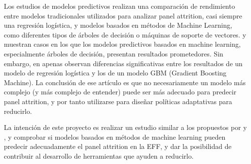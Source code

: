 Los estudios de modelos predictivos realizan una comparación de rendimiento entre modelos tradicionales utilizados para analizar panel attrition, casi siempre una regresión logística, y modelos basados en métodos de Machine Learning, como diferentes tipos de árboles de decisión o máquinas de soporte de vectores. \cite{kern2019tree} y \cite{kern2021predicting} muestran casos en los que los modelos predictivos basados en machine learning, especialmente árboles de decisión, presentan resultados prometedores. Sin embargo, en \cite{jankowsky2022validation} apenas observan diferencias significativas entre los resultados de un modelo de regresión logística y los de un modelo GBM (Gradient Boosting Machine). La conclusión de ese artículo es que no necesariamente un modelo más complejo (y más complejo de entender) puede ser más adecuado para predecir panel attrition, y por tanto utilizarse para diseñar políticas adaptativas para reducirlo.

La intención de este proyecto es realizar un estudio similar a los propuestos por \cite{kern2021predicting} y \cite{jankowsky2022validation}, y comprobar si modelos basados en métodos de machine learning pueden predecir adecuadamente el panel attrition en la EFF, y dar la posibilidad de contribuir al desarrollo de herramientas que ayuden a reducirlo.